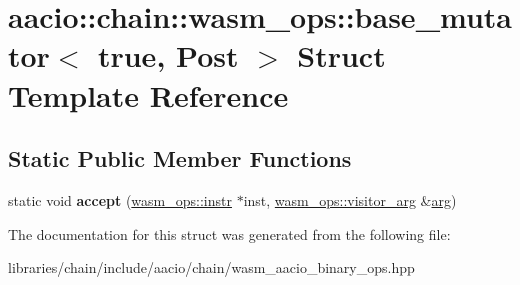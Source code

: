 \hypertarget{structaacio_1_1chain_1_1wasm__ops_1_1base__mutator_3_01true_00_01_post_01_4}{}\section{aacio\+:\+:chain\+:\+:wasm\+\_\+ops\+:\+:base\+\_\+mutator$<$ true, Post $>$ Struct Template Reference}
\label{structaacio_1_1chain_1_1wasm__ops_1_1base__mutator_3_01true_00_01_post_01_4}
\subsection*{Static Public Member Functions}
\begin{DoxyCompactItemize}
\item 
\mbox{\label{structaacio_1_1chain_1_1wasm__ops_1_1base__mutator_3_01true_00_01_post_01_4_a9930e49a7bd552d093ce2ce7a43865ed}} 
static void {\bfseries accept} (\mbox{\hyperlink{structaacio_1_1chain_1_1wasm__ops_1_1instr}{wasm\+\_\+ops\+::instr}} $\ast$inst, \mbox{\hyperlink{structaacio_1_1chain_1_1wasm__ops_1_1visitor__arg}{wasm\+\_\+ops\+::visitor\+\_\+arg}} \&\mbox{\hyperlink{unionarg}{arg}})
\end{DoxyCompactItemize}


The documentation for this struct was generated from the following file\+:\begin{DoxyCompactItemize}
\item 
libraries/chain/include/aacio/chain/wasm\+\_\+aacio\+\_\+binary\+\_\+ops.\+hpp\end{DoxyCompactItemize}
